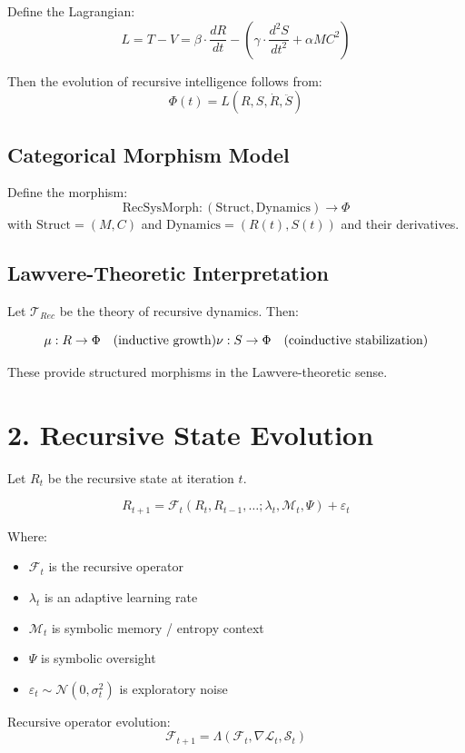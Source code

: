 \documentclass{article}
\begin{document}
Define the Lagrangian:
\[
L = T - V = \beta \cdot \frac{dR}{dt} - \left(\gamma \cdot \frac{d^2S}{dt^2} + \alpha M C^2 \right)
\]

Then the evolution of recursive intelligence follows from:
\[
\Phi(t) = L(R, S, \dot{R}, \ddot{S})
\]

\subsection*{Categorical Morphism Model}

Define the morphism:
\[
\text{RecSysMorph} : (\text{Struct}, \text{Dynamics}) \rightarrow \Phi
\]
with $\text{Struct} = (M, C)$ and $\text{Dynamics} = (R(t), S(t))$ and their derivatives.

\subsection*{Lawvere-Theoretic Interpretation}

Let $\mathcal{T}_{Rec}$ be the theory of recursive dynamics. Then:

\[
\mu : R \rightarrow \Phi \quad (\text{inductive growth}) \\
\nu : S \rightarrow \Phi \quad (\text{coinductive stabilization})
\]

These provide structured morphisms in the Lawvere-theoretic sense.

\section*{2. Recursive State Evolution}

Let $R_t$ be the recursive state at iteration $t$.

\[
R_{t+1} = \mathcal{F}_t(R_t, R_{t-1}, \dots; \lambda_t, \mathcal{M}_t, \Psi) + \varepsilon_t
\]

Where:
\begin{itemize}
  \item $\mathcal{F}_t$ is the recursive operator
  \item $\lambda_t$ is an adaptive learning rate
  \item $\mathcal{M}_t$ is symbolic memory / entropy context
  \item $\Psi$ is symbolic oversight
  \item $\varepsilon_t \sim \mathcal{N}(0, \sigma_t^2)$ is exploratory noise
\end{itemize}

Recursive operator evolution:
\[
\mathcal{F}_{t+1} = \Lambda(\mathcal{F}_t, \nabla \mathcal{L}_t, \mathcal{S}_t)
\]
\end{document}

